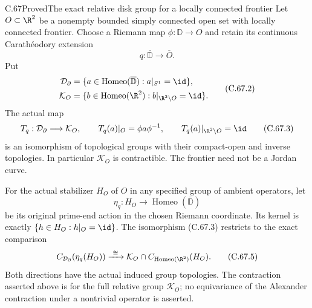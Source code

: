 \begin{claim}{C.67}{Proved}{The exact relative disk group for a locally connected frontier}
Let $O\subset\R^2$ be a nonempty bounded simply
connected open set with locally connected frontier.
Choose a Riemann map $\phi:\mathbb D\to O$ and
retain its continuous Carath\'eodory extension
\[
                  q:\overline{\mathbb D}\longrightarrow\overline O.
                                                               \tag{C.67.1}
\]
Put
\[
 \begin{split}
 \mathcal D_\partial
     &=\{a\in\operatorname{Homeo}(\overline{\mathbb D}):
                                      a|_{S^1}=\id\},\\
 \mathcal K_O
     &=\{b\in\operatorname{Homeo}(\R^2):
                                b|_{\R^2\setminus O}=\id\}.
 \end{split}                                             \tag{C.67.2}
\]
The actual map
\[
 T_q:\mathcal D_\partial\longrightarrow\mathcal K_O,
 \qquad
 T_q(a)|_O=\phi a\phi^{-1},\qquad
 T_q(a)|_{\R^2\setminus O}=\id
                                                               \tag{C.67.3}
\]
is an isomorphism of topological groups with their
compact-open and inverse topologies.
In particular $\mathcal K_O$ is contractible.
The frontier need not be a Jordan curve.

For the actual stabilizer $H_O$ of $O$ in any
specified group of ambient operators, let
\[
 \eta_q:H_O\longrightarrow
                   \operatorname{Homeo}(\overline{\mathbb D})
                                                               \tag{C.67.4}
\]
be its original prime-end action in the chosen
Riemann coordinate. Its kernel is exactly
$\{h\in H_O:h|_O=\id\}$. The isomorphism (C.67.3)
restricts to the exact comparison
\[
 C_{\mathcal D_\partial}(\eta_q(H_O))
   \xrightarrow{\ \cong\ }
       \mathcal K_O\cap
               C_{\operatorname{Homeo}(\R^2)}(H_O).
                                                               \tag{C.67.5}
\]
Both directions have the actual induced group
topologies. The contraction asserted above is
for the full relative group $\mathcal K_O$;
no equivariance of the Alexander contraction
under a nontrivial operator is asserted.
\end{claim}

